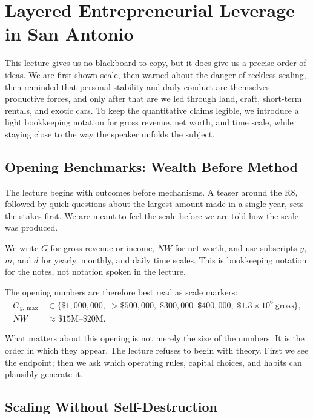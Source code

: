 \chapter{Layered Entrepreneurial Leverage in San Antonio}

This lecture gives us no blackboard to copy, but it does give us a precise order of ideas. We are first shown scale, then warned about the danger of reckless scaling, then reminded that personal stability and daily conduct are themselves productive forces, and only after that are we led through land, craft, short-term rentals, and exotic cars. To keep the quantitative claims legible, we introduce a light bookkeeping notation for gross revenue, net worth, and time scale, while staying close to the way the speaker unfolds the subject.

\section{Opening Benchmarks: Wealth Before Method}

The lecture begins with outcomes before mechanisms. A teaser around the R8, followed by quick questions about the largest amount made in a single year, sets the stakes first. We are meant to feel the scale before we are told how the scale was produced.

\begin{definition}
We write \(G\) for gross revenue or income, \(NW\) for net worth, and use subscripts \(y\), \(m\), and \(d\) for yearly, monthly, and daily time scales. This is bookkeeping notation for the notes, not notation spoken in the lecture.
\end{definition}

The opening numbers are therefore best read as scale markers:
\begin{align}
G_{y,\max}
&\in
\{\$1{,}000{,}000,\;>\$500{,}000,\;\$300{,}000\text{--}\$400{,}000,\;\$1.3\times 10^6\ \text{gross}\},\\
NW
&\approx \$15\text{M}\text{--}\$20\text{M}.
\end{align}

What matters about this opening is not merely the size of the numbers. It is the order in which they appear. The lecture refuses to begin with theory. First we see the endpoint; then we ask which operating rules, capital choices, and habits can plausibly generate it.

\section{Scaling Without Self-Destruction}

